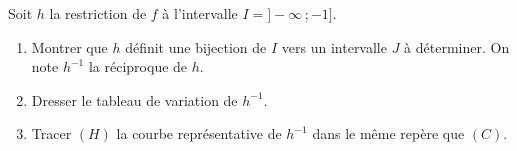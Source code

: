 \documentclass[11pt]{article}
\begin{document}
Soit $h$ la restriction de $f$ à l'intervalle $I = ]-\infty\,;-1]$.

\begin{enumerate}
  \item Montrer que $h$ définit une bijection de $I$ vers un intervalle $J$ à déterminer. On note $h^{-1}$ la réciproque de $h$.
  \item Dresser le tableau de variation de $h^{-1}$.
  \item Tracer $(H)$ la courbe représentative de $h^{-1}$ dans le même repère que $(C)$.
\end{enumerate}
\end{document}
